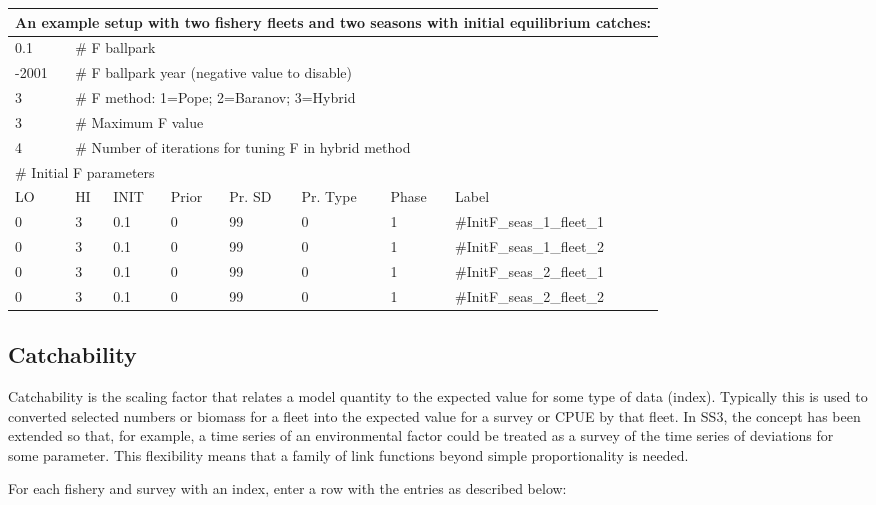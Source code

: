 \begin{longtable}{p{1.3cm} p{1.3cm} p{1.3cm} p{1.3cm} p{1.5cm} p{1.5cm} p{1.4cm} p{2.3cm}}
	\multicolumn{8}{l}{An example setup with two fishery fleets and two seasons with initial equilibrium catches:} \\
	\hline
	0.1 & \multicolumn{7}{l}{\# F ballpark} \Tstrut\Bstrut\\
	\hline
	-2001 & \multicolumn{7}{l}{\# F ballpark year (negative value to disable)} \Tstrut\Bstrut\\
	\hline
	3 & \multicolumn{7}{l}{\# F method: 1=Pope; 2=Baranov; 3=Hybrid} \Tstrut\Bstrut\\
	\hline
	3 & \multicolumn{7}{l}{\# Maximum F value} \Tstrut\Bstrut\\
	\hline
	4 & \multicolumn{7}{l}{\# Number of iterations for tuning F in hybrid method} \Tstrut\Bstrut\\
	\hline
	\multicolumn{8}{l}{\# Initial F parameters} \Tstrut\Bstrut\\
	LO & HI & INIT & Prior & Pr. SD & Pr. Type & Phase & Label \Bstrut\\
	\hline
	0 & 3 & 0.1 & 0 & 99 & 0 & 1 & \#InitF\_seas\_1\_fleet\_1 \Tstrut\Bstrut\\
	\hline
	0 & 3 & 0.1 & 0 & 99 & 0 & 1 & \#InitF\_seas\_1\_fleet\_2 \Tstrut\Bstrut\\
	\hline
	0 & 3 & 0.1 & 0 & 99 & 0 & 1 & \#InitF\_seas\_2\_fleet\_1 \Tstrut\Bstrut\\
	\hline
	0 & 3 & 0.1 & 0 & 99 & 0 & 1 & \#InitF\_seas\_2\_fleet\_2 \Tstrut\Bstrut\\
	\hline
\end{longtable}


\hypertarget{Qsetup}{}
\subsection{Catchability}
Catchability is the scaling factor that relates a model quantity to the expected value for some type of data (index). Typically this is used to converted selected numbers or biomass for a fleet into the expected value for a survey or CPUE by that fleet. In SS3, the concept has been extended so that, for example, a time series of an environmental factor could be treated as a survey of the time series of deviations for some parameter. This flexibility means that a family of link functions beyond simple proportionality is needed.

For each fishery and survey with an index, enter a row with the entries as described below:

